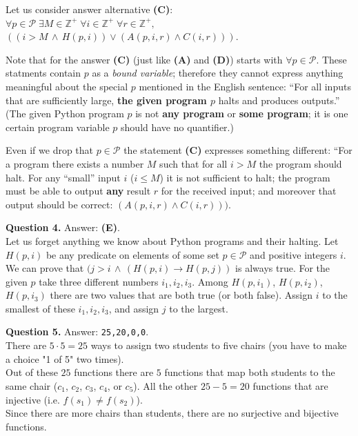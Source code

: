 \documentclass[jou]{apa6}
\begin{document}
Let us consider answer alternative {\bf (C)}:\\
$\forall p \in \mathcal{P}\; \exists M \in \mathbb{Z}^{+}\; \forall i \in \mathbb{Z}^{+}\;
\forall r \in \mathbb{Z}^{+},$\\
$((i > M \,\wedge\, H(p,i)) \vee (A(p,i,r) \wedge C(i,r)))$.

Note that for the answer {\bf (C)} (just like {\bf (A)} and {\bf (D)}) 
starts with $\forall p \in \mathcal{P}$. These statments contain 
$p$ as a {\em bound variable}; therefore they cannot express anything 
meaningful about the special $p$ mentioned in the English sentence: 
``For all inputs that are sufficiently large, {\bf the given program $p$}
halts and produces outputs.'' (The given Python program $p$ is not {\bf any program} or 
{\bf some program}; it is one certain program \textendash{} variable $p$ 
should have no quantifier.)

Even if we drop that $p \in \mathcal{P}$ the statement {\bf (C)} expresses 
something different: ``For a program there exists a number $M$ such that for all $i > M$ 
the program should halt. For any ``small'' input $i$ ($i \leq M$) it is not sufficient to halt; 
the program must be able to output {\bf any} result $r$ for the received input; 
and moreover \textendash{} that output should be correct:
$(A(p,i,r) \wedge C(i,r)))$.

\vspace{6pt}
{\bf Question 4.} Answer: {\bf (E)}.\\
Let us forget anything we know about Python programs and their halting. 
Let $H(p,i)$ be any predicate on elements of some set $p \in \mathcal{P}$ and  
positive integers $i$. We can prove that 
$(j > i \,\wedge\, (H(p,i) \rightarrow H(p,j))$ is always true. 
For the given $p$ take three different numbers $i_1,i_2,i_3$. Among 
$H(p,i_1)$, $H(p,i_2)$, $H(p,i_3)$ there are two values that are both true (or both false). 
Assign $i$ to the smallest of these $i_1,i_2,i_3$, and assign $j$ to the largest. 


\vspace{6pt}
{\bf Question 5.} Answer: {\tt 25,20,0,0}.\\
There are $5 \cdot 5 = 25$ ways to assign two students to five chairs
(you have to make a choice "1 of 5" two times).\\
Out of these $25$ functions there are $5$ functions that map both students
to the same chair ($c_1$, $c_2$, $c_3$, $c_4$, or $c_5$). All the other
$25-5 = 20$ functions that are injective (i.e. $f(s_1) \neq f(s_2)$).\\
Since there are more chairs than students, there are no surjective and bijective
functions.
\end{document}
